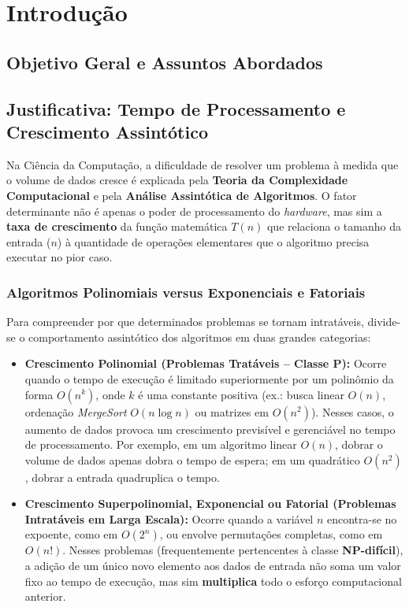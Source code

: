 
\chapter*[Introdução]{Introdução}

\section*{Objetivo Geral e Assuntos Abordados}

\section*{Justificativa: Tempo de Processamento e Crescimento Assintótico}

Na Ciência da Computação, a dificuldade de resolver um problema à medida que o volume de dados cresce é explicada pela \textbf{Teoria da Complexidade Computacional} e pela \textbf{Análise Assintótica de Algoritmos}. O fator determinante não é apenas o poder de processamento do \textit{hardware}, mas sim a \textbf{taxa de crescimento} da função matemática $T(n)$ que relaciona o tamanho da entrada ($n$) à quantidade de operações elementares que o algoritmo precisa executar no pior caso.

\subsection*{Algoritmos Polinomiais versus Exponenciais e Fatoriais}

Para compreender por que determinados problemas se tornam intratáveis, divide-se o comportamento assintótico dos algoritmos em duas grandes categorias:

\begin{itemize}
    \item \textbf{Crescimento Polinomial (Problemas Tratáveis -- Classe P):} Ocorre quando o tempo de execução é limitado superiormente por um polinômio da forma $O(n^k)$, onde $k$ é uma constante positiva (ex.: busca linear $O(n)$, ordenação \textit{MergeSort} $O(n \log n)$ ou matrizes em $O(n^2)$). Nesses casos, o aumento de dados provoca um crescimento previsível e gerenciável no tempo de processamento. Por exemplo, em um algoritmo linear $O(n)$, dobrar o volume de dados apenas dobra o tempo de espera; em um quadrático $O(n^2)$, dobrar a entrada quadruplica o tempo.
    \item \textbf{Crescimento Superpolinomial, Exponencial ou Fatorial (Problemas Intratáveis em Larga Escala):} Ocorre quando a variável $n$ encontra-se no expoente, como em $O(2^n)$, ou envolve permutações completas, como em $O(n!)$. Nesses problemas (frequentemente pertencentes à classe \textbf{NP-difícil}), a adição de um único novo elemento aos dados de entrada não soma um valor fixo ao tempo de execução, mas sim \textbf{multiplica} todo o esforço computacional anterior.
\end{itemize}

